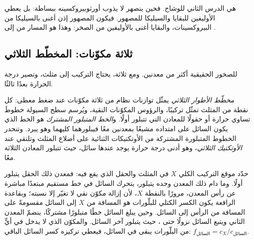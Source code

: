  هي الدرس الثاني للوشاح. فحين ينصهر  لا
يذوب أورثوبيروكسينه ببساطة: بل يعطي الأوليفين للبقايا والسيليكا
للمصهور. فيكون المصهور إذن أغنى بالسيليكا من البيروكسينات،
والبقايا أغنى بالأوليفين من الصخر: وهذا هو المسار من  إلى 
.

\subsection*{ثلاثة مكوّنات: المخطّط الثلاثي}

للصخور الحقيقية أكثر من معدنين. ومع ثلاثة، يحتاج التركيب إلى
مثلث، وتصير درجة الحرارة بعدًا ثالثًا.

\begin{definition}\label{def:b2:mantle-melting:ternary}
\emph{مخطّط الأطوار الثلاثي} يمثّل
توازنات نظام من ثلاثة مكوّنات عند ضغط معطى: كل نقطة من
المثلث تمثّل تركيبًا، والرؤوس المكوّنات النقية،
ويُرسم سطح السيولة خطوطَ تساوي حرارة أو حقولًا للمعادن
التي تتبلور أولًا. و\emph{الخط المتبلور المشترك} هو
الخط الذي يكون السائل على امتداده مشبعًا بمعدنين معًا فيبلورهما
كليهما وهو يبرد. وتنحدر الخطوط المتبلورة المشتركة من الأوتكتيكات الثنائية
على أضلاع المثلث وتلتقي عند \emph{الأوتكتيك
الثلاثي}، وهو أدنى درجة حرارة يوجد عندها سائل،
حيث تتبلور المعادن الثلاثة معًا.
\end{definition}

\begin{method}\label{met:b2:mantle-melting:ternary}
حدّد موقع التركيب الكلي $X$ في المثلث والحقل الذي يقع فيه:
فمعدن ذلك الحقل يتبلور أولًا. وما دام ذلك المعدن وحده يتبلور،
يتحرك السائل في خط مستقيم مبتعدًا مباشرة عن رأس المعدن،
مرورًا بالنقطة $X$، لأن إزالة مكوّن نقي لا تغيّر إلا نسبته؛ وبقاعدة
الرافعة يكون الكسر الكتلي للبلّورات هو المسافة من $X$ إلى السائل
مقسومةً على المسافة من الرأس إلى السائل. وحين يبلغ السائل
خطًا متبلورًا مشتركًا، ينضمّ المعدن الثاني ويتبع السائل 
نزولًا حتى ، حيث يتبلور آخر السائل. والمكوّن
الذي لا يدخل في أيٍّ من البلّورات يبقى في السائل، فيعطي تركيزه
كسر السائل الباقي: $f_{\text{السائل}} = c_X/c_{\text{السائل}}$.
\end{method}

